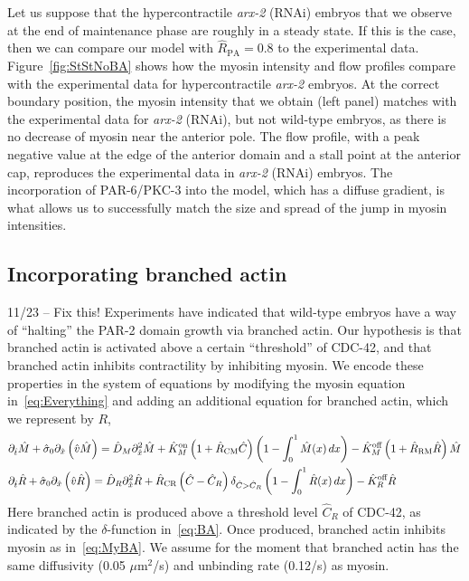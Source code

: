 \documentclass[11pt]{article}
\newcommand{\red}[1]{\color{red}#1\normalcolor}
\newcommand{\6}[1]{#1_{\text{6}}}
\newcommand{\3}[1]{#1_{\text{3}}}
\begin{document}
Let us suppose that the hypercontractile \emph{arx-2} (RNAi) embryos that we observe at the end of maintenance phase are roughly in a steady state. If this is the case, then we can compare our model with $\hat R_\text{PA}=0.8$ to the experimental data. Figure\ \ref{fig:StStNoBA} shows how the myosin intensity and flow profiles compare with the experimental data for hypercontractile \emph{arx-2} embryos. At the correct boundary position, the myosin intensity that we obtain (left panel) matches with the experimental data for \emph{arx-2} (RNAi), but not wild-type embryos, as there is no decrease of myosin near the anterior pole. The flow profile, with a peak negative value at the edge of the anterior domain and a stall point at the anterior cap, reproduces the experimental data in \emph{arx-2} (RNAi) embryos. The incorporation of PAR-6/PKC-3 into the model, which has a diffuse gradient, is what allows us to successfully match the size and spread of the jump in myosin intensities.


\subsection{Incorporating branched actin}
\red{11/23 -- Fix this!} Experiments have indicated that wild-type embryos have a way of ``halting'' the PAR-2 domain growth via branched actin. Our hypothesis is that branched actin is activated above a certain ``threshold'' of CDC-42, and that branched actin inhibits contractility by inhibiting myosin. We encode these properties in the system of equations by modifying the myosin equation in\ \eqref{eq:Everything} and adding an additional equation for branched actin, which we represent by $R$,  
\begin{subequations} 
\label{eq:BAll}
\begin{align}
\label{eq:MyBA}
&\partial_{\hat{t}} \hat{M} +\hat{\sigma}_0  \partial_{\hat{x}} \left(\hat{v} \hat{M} \right) =\hat{D}_M \partial_{\hat{x}}^2 \hat{M} +\hat{K}^\text{on}_M \left(1+\hat{R}_\text{CM} \hat C\right) \left(1-\int_0^1  \hat{M}(x) \, dx\right)- \hat{K}^\text{off}_M \left(1+\hat R_\text{RM} \hat R\right) \hat{M}\\
\label{eq:BA}
&\partial_{\hat{t}} \hat{R} +\hat{\sigma}_0  \partial_{\hat{x}} \left(\hat{v} \hat{R} \right) =\hat{D}_R \partial_{\hat{x}}^2 \hat{R} +\hat R_\text{CR} \left(\hat C-\hat C_R\right) {\delta}_{\hat C > \hat C_R} \left(1-\int_0^1  \hat{R}(x) \, dx\right)- \hat{K}^\text{off}_R \hat{R}
\end{align}
\end{subequations}
Here branched actin is produced above a threshold level $\hat C_R$ of CDC-42, as indicated by the $\delta$-function in\ \eqref{eq:BA}. Once produced, branched actin inhibits myosin as in\ \eqref{eq:MyBA}. \red{We assume for the moment that branched actin has the same diffusivity (0.05 $\mu$m$^2$/s) and unbinding rate (0.12/s) as myosin.}
\end{document}
